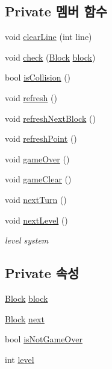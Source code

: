 \subsection*{Private 멤버 함수}
\begin{DoxyCompactItemize}
\item 
void \hyperlink{class_game_logic_aa94e4cc11eb878caf3b4889e267fd7d7}{clear\+Line} (int line)
\item 
void \hyperlink{class_game_logic_afabf48aab0520a7ecd576bfc178d4767}{check} (\hyperlink{class_block}{Block} \hyperlink{class_game_logic_a499d9b05317bb6a77bf3521f42a6638a}{block})
\item 
bool \hyperlink{class_game_logic_a1c534033fe42c8af4fb0e11e3fed2cfa}{is\+Collision} ()
\item 
void \hyperlink{class_game_logic_aff831622dc54c1737e76b00d0d44ccef}{refresh} ()
\item 
void \hyperlink{class_game_logic_a81fa5e44fb6dc431c926f7c3fd0b7cdb}{refresh\+Next\+Block} ()
\item 
void \hyperlink{class_game_logic_a3f19ca1ad6a1c829afe571f7ac25d3c5}{refresh\+Point} ()
\item 
void \hyperlink{class_game_logic_af6ba400e79f01e5c59f48f55273894e6}{game\+Over} ()
\item 
void \hyperlink{class_game_logic_abf26417f7a1fff03e6639b8bd69490f0}{game\+Clear} ()
\item 
void \hyperlink{class_game_logic_a70b7fcd97d321dfb9d2130f864ddac3b}{next\+Turn} ()
\item 
void \hyperlink{class_game_logic_a5cc64703af4a64975fe24aa5c1d3c711}{next\+Level} ()
\begin{DoxyCompactList}\small\item\em level system \end{DoxyCompactList}\end{DoxyCompactItemize}
\subsection*{Private 속성}
\begin{DoxyCompactItemize}
\item 
\hyperlink{class_block}{Block} \hyperlink{class_game_logic_a499d9b05317bb6a77bf3521f42a6638a}{block}
\item 
\hyperlink{class_block}{Block} \hyperlink{class_game_logic_a42f7be1948bf9cf0a8ff05d7544f62bc}{next}
\item 
bool \hyperlink{class_game_logic_ae09fc4252ad9db62b810117567783880}{is\+Not\+Game\+Over}
\item 
int \hyperlink{class_game_logic_aca26b3a67b4bb5d5d477f9873826aae8}{level}
\end{DoxyCompactItemize}


